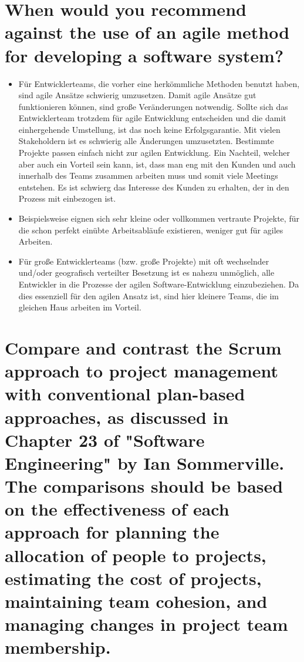 \documentclass[a4paper,10pt]{article}
\begin{document}
\section*{When would you recommend against the use of an agile method for developing a software system?}
\begin{itemize}
 \item[] Für Entwicklerteams, die vorher eine herkömmliche Methoden benutzt haben, sind agile Ansätze schwierig umzusetzen. Damit agile Ansätze gut funktionieren können, sind große Veränderungen notwendig. Sollte sich das Entwicklerteam trotzdem für agile Entwicklung entscheiden und die damit einhergehende Umstellung, ist das noch keine Erfolgsgarantie. Mit vielen Stakeholdern ist es schwierig alle Änderungen umzusetzten. Bestimmte Projekte passen einfach nicht zur agilen Entwicklung. Ein Nachteil, welcher aber auch ein Vorteil sein kann, ist, dass man eng mit den Kunden und auch innerhalb des Teams zusammen arbeiten muss und somit viele Meetings entstehen. Es ist schwierg das Interesse des Kunden zu erhalten, der in den Prozess mit einbezogen ist.
 \item[] Beispielsweise eignen sich sehr kleine oder vollkommen vertraute Projekte, für die schon perfekt einübte Arbeitsabläufe existieren, weniger gut für agiles Arbeiten.
 \item[] Für große Entwicklerteams (bzw. große Projekte) mit oft wechselnder und/oder geografisch verteilter Besetzung ist es nahezu unmöglich, alle Entwickler in die Prozesse der agilen Software-Entwicklung einzubeziehen. Da dies essenziell für den agilen Ansatz ist, sind hier kleinere Teams, die im gleichen Haus arbeiten im Vorteil.
\end{itemize}
\section*{Compare and contrast the Scrum approach to project management with conventional plan-based approaches, as discussed in Chapter 23 of "Software Engineering" by Ian Sommerville. The comparisons should be based on the effectiveness of each approach for planning the allocation of people to projects, estimating the cost of projects, maintaining team cohesion, and managing changes in project team membership.}
\end{document}
